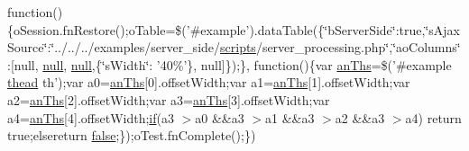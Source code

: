 \begin{DoxyCompactItemize}
function()\{o\+Session.\+fn\+Restore();o\+Table=\$('\#example').data\+Table(\{\char`\"{}b\+Server\+Side\char`\"{}\+:true,\char`\"{}s\+Ajax\+Source\char`\"{}\+:\char`\"{}../../../examples/server\+\_\+side/\hyperlink{tinymce_8jquery_8dev_8js_a09066d4d580eeec222f858d588b4cdef}{scripts}/server\+\_\+processing.\+php\char`\"{},\char`\"{}ao\+Columns\char`\"{}\+:\mbox{[}null, \hyperlink{validate_8js_afb8e110345c45e74478894341ab6b28e}{null}, \hyperlink{validate_8js_afb8e110345c45e74478894341ab6b28e}{null},\{\char`\"{}s\+Width\char`\"{}\+: '40\%'\}, null\mbox{]}\});\}, function()\{var \hyperlink{core_8constructor_8js_a0cd65fec9902e4fa46c225b0ec74e5a7}{an\+Ths}=\$('\#example \hyperlink{core_8constructor_8js_a856be760b6816c9591ce69f0a2b43693}{thead} th');var a0=\hyperlink{core_8constructor_8js_a0cd65fec9902e4fa46c225b0ec74e5a7}{an\+Ths}\mbox{[}0\mbox{]}.offset\+Width;var a1=\hyperlink{core_8constructor_8js_a0cd65fec9902e4fa46c225b0ec74e5a7}{an\+Ths}\mbox{[}1\mbox{]}.offset\+Width;var a2=\hyperlink{core_8constructor_8js_a0cd65fec9902e4fa46c225b0ec74e5a7}{an\+Ths}\mbox{[}2\mbox{]}.offset\+Width;var a3=\hyperlink{core_8constructor_8js_a0cd65fec9902e4fa46c225b0ec74e5a7}{an\+Ths}\mbox{[}3\mbox{]}.offset\+Width;var a4=\hyperlink{core_8constructor_8js_a0cd65fec9902e4fa46c225b0ec74e5a7}{an\+Ths}\mbox{[}4\mbox{]}.offset\+Width;\hyperlink{fullpage_2plugin_8js_a8b98017e64ef036adb9ae327ff94abe1}{if}(a3 $>$a0 \&\&a3 $>$a1 \&\&a3 $>$a2 \&\&a3 $>$a4) return true;elsereturn \hyperlink{validate_8js_a5df37b7f02e5cdc7d9412b7f872b8e01}{false};\});o\+Test.\+fn\+Complete();\})
\end{DoxyCompactItemize}


